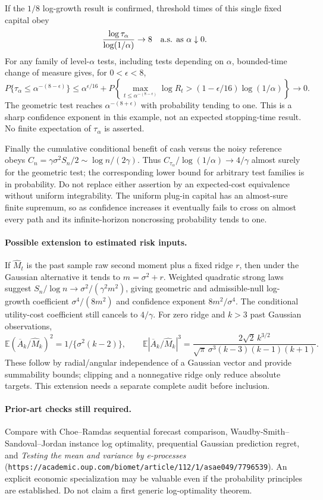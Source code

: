 If the $1/8$ log-growth result is confirmed, threshold times of this single
fixed capital obey
\[
 \frac{\log\tau_\alpha}{\log(1/\alpha)}\to8\quad\hbox{a.s. as }\alpha\downarrow0.
\]
For any family of level-$\alpha$ tests, including tests depending on $\alpha$,
bounded-time change of measure gives, for $0<\epsilon<8$,
\[
 P\{\tau_\alpha\le\alpha^{-(8-\epsilon)}\}
 \le\alpha^{\epsilon/16}
   +P\!\left\{\max_{t\le\alpha^{-(8-\epsilon)}}\log R_t
                   >(1-\epsilon/16)\log(1/\alpha)\right\}\to0.
\]
The geometric test reaches $\alpha^{-(8+\epsilon)}$ with probability tending
to one. This is a sharp confidence exponent in this example, not an expected
stopping-time result. No finite expectation of $\tau_\alpha$ is asserted.

Finally the cumulative conditional benefit of cash versus the noisy reference
obeys $C_n=\gamma\sigma^2 S_n/2\sim\log n/(2\gamma)$.
Thus $C_{\tau_\alpha}/\log(1/\alpha)\to4/\gamma$ almost surely for the
geometric test; the corresponding lower bound for arbitrary test families
is in probability. Do not replace either assertion by an expected-cost
equivalence without uniform integrability. The uniform plug-in capital has
an almost-sure finite supremum, so as confidence increases it eventually
fails to cross on almost every path and its infinite-horizon noncrossing
probability tends to one.

\paragraph{Possible extension to estimated risk inputs.}
If $\widehat M_t$ is the past sample raw second moment plus a fixed ridge $r$,
then under the Gaussian alternative it tends to $m=\sigma^2+r$.
Weighted quadratic strong laws suggest $S_n/\log n\to\sigma^2/(\gamma^2m^2)$,
giving geometric and admissible-null log-growth coefficient
$\sigma^4/(8m^2)$ and confidence exponent $8m^2/\sigma^4$.
The conditional utility-cost coefficient still cancels to $4/\gamma$.
For zero ridge and $k>3$ past Gaussian observations,
\[
 \mathbb E(\overline A_k/\widehat M_k)^2=1/\{\sigma^2(k-2)\},\qquad
 \mathbb E|\overline A_k/\widehat M_k|^3
 =\frac{2\sqrt2\,k^{3/2}}
 {\sqrt\pi\,\sigma^3(k-3)(k-1)(k+1)}.
\]
These follow by radial/angular independence of a Gaussian vector and provide
summability bounds; clipping and a nonnegative ridge only reduce absolute
targets. This extension needs a separate complete audit before inclusion.

\paragraph{Prior-art checks still required.}
Compare with Choe--Ramdas sequential forecast comparison, Waudby-Smith--
Sandoval--Jordan instance log optimality, prequential Gaussian prediction
regret, and \emph{Testing the mean and variance by e-processes}
(\texttt{https://academic.oup.com/biomet/article/112/1/asae049/7796539}).
An explicit economic specialization may be valuable even if the probability
principles are established. Do not claim a first generic log-optimality theorem.

